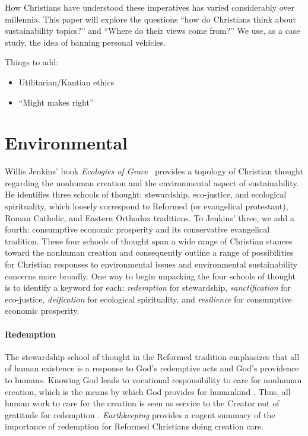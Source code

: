 \documentclass[12pt]{article}
\begin{document}
How Christians have understood these imperatives has varied considerably over millennia. 
This paper will explore the questions ``how do Christians think about
sustainability topics?'' and ``Where do their views come from?'' 
We use, as a case study, the idea of banning personal vehicles.

Things to add:

\begin{itemize}

  \item Utilitarian/Kantian ethics

  \item ``Might makes right''

\end{itemize}


\section{Environmental}
\label{sec:environmental}

Willis Jenkins' book \emph{Ecologies of Grace}~\autocite{Jenkins:2008}
provides a topology of Christian thought regarding the 
nonhuman creation and the
environmental aspect of sustainability.
He identifies three schools of thought:
stewardship, 
eco-justice, and 
ecological spirituality,
which loosely correspond to 
Reformed (or evangelical protestant), 
Roman Catholic, and 
Eastern Orthodox 
traditions.
To Jenkins' three, we add a fourth:
consumptive economic prosperity and
its conservative evangelical tradition. 
These four schools of thought 
span a wide range of Christian stances toward the nonhuman creation
and 
consequently outline a range of possibilities 
for Christian responses to environmental issues
and environmental sustainability concerns more broadly.
One way to begin unpacking the four schools of thought 
is to identify a keyword for each:
\emph{redemption} for stewardship, 
\emph{sanctification} for eco-justice,
\emph{deification} for ecological spirituality, and
\emph{resilience} for consumptive economic prosperity.

\paragraph{Redemption} 
\label{sec:redemption}

The stewardship school of thought in the Reformed tradition
emphasizes that all of human existence
is a response to God's redemptive acts
and God's providence to humans.
Knowing God leads to vocational responsibility 
to care for nonhuman creation,
which is the means by which God provides for humankind \autocite[19]{Jenkins:2008}. 
Thus, all human work to care for the creation 
is seen as service to the Creator
out of gratitude for redemption \autocite[77]{Jenkins:2008}.
\emph{Earthkeeping} \autocite{Wilkenson:1980aa} provides a cogent summary
of the importance of redemption for Reformed Christians doing creation care.
\end{document}
